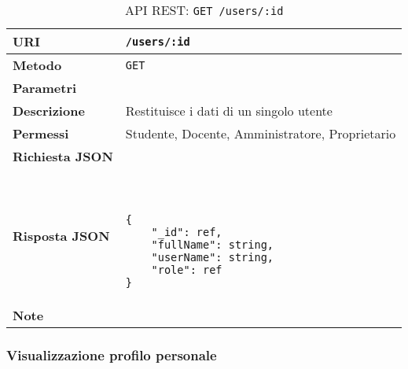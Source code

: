         \begin{table}[H]
            \begin{center}
                \begin{tabular}{p{} p{}}
                    \toprule
                    \textbf{URI} & \texttt{/users/:id} \\ \midrule
                    \textbf{Metodo} & \texttt{GET} \\ \midrule
                    \textbf{Parametri} & \\ \midrule
                    \textbf{Descrizione} & Restituisce i dati di un singolo utente \\ \midrule
                    \textbf{Permessi} & Studente, Docente, Amministratore, Proprietario \\ \midrule
                    \textbf{Richiesta JSON} & \\ \midrule
                    \textbf{Risposta JSON} & \
                        \begin{lstlisting}[basicstyle={\ttfamily}]
{
    "_id": ref,
    "fullName": string,
    "userName": string,
    "role": ref
}
                        \end{lstlisting}
                        \\ \midrule
                    \textbf{Note} & \\
                    \bottomrule
                \end{tabular}
                \caption{API REST: \texttt{GET /users/:id}}
            \end{center}
        \end{table}

    \subsubsection{Visualizzazione profilo personale}

